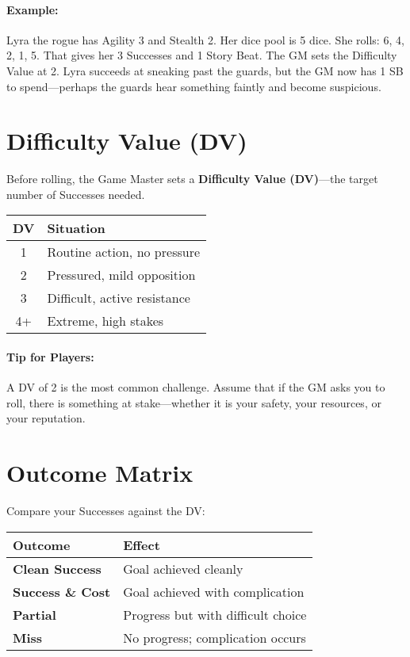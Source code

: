 \begin{multicols}{2}
\paragraph{Example:}  
Lyra the rogue has Agility 3 and Stealth 2. Her dice pool is 5 dice. She rolls: 6, 4, 2, 1, 5. That gives her 3 Successes and 1 Story Beat. The GM sets the Difficulty Value at 2. Lyra succeeds at sneaking past the guards, but the GM now has 1 SB to spend—perhaps the guards hear something faintly and become suspicious.

\section{Difficulty Value (DV)} 

Before rolling, the Game Master sets a \textbf{Difficulty Value (DV)}—the target number of Successes needed.

\begin{center}
\small
\begin{tabular}{cl}
\toprule
\textbf{DV} & \textbf{Situation} \\
\midrule
1 & Routine action, no pressure \\
2 & Pressured, mild opposition \\
3 & Difficult, active resistance \\
4+ & Extreme, high stakes \\
\bottomrule
\end{tabular}
\end{center}

\paragraph{Tip for Players:} A DV of 2 is the most common challenge. Assume that if the GM asks you to roll, there is something at stake—whether it is your safety, your resources, or your reputation.

\section{Outcome Matrix} 

Compare your Successes against the DV:

\begin{center}
\small
\begin{tabular}{ll}
\toprule
\textbf{Outcome} & \textbf{Effect} \\
\midrule
\textbf{Clean Success}\index{Success!Clean} & Goal achieved cleanly \\
\textbf{Success \& Cost}\index{Success!with Cost} & Goal achieved with complication \\
\textbf{Partial}\index{Partial} & Progress but with difficult choice \\
\textbf{Miss}\index{Miss} & No progress; complication occurs \\
\bottomrule
\end{tabular}
\end{center}


\end{multicols}

